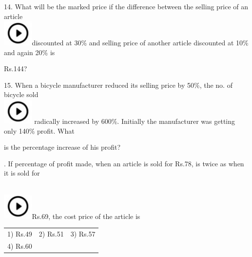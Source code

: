 \documentclass{article} %
\begin{document}
\noindent 

14. What will be  the  marked  price if the  difference between the  selling price  of an article  
\noindent \\ \includegraphics*[width=0.60in, height=0.52in]{images/image1}discounted at 30\% and selling price of another article discounted at 10\% and again 20\% is

\noindent Rs.144?

\noindent 

\noindent 

15. When  a  bicycle  manufacturer  reduced  its  selling  price  by  50\%,  the  no.  of  bicycle  sold  
\noindent \\ \includegraphics*[width=0.60in, height=0.52in]{images/image1} radically increased by 600\%. Initially the manufacturer was getting only 140\% profit. What

\noindent is the percentage increase of his profit?

\noindent 

\noindent 

. If percentage of profit made, when an article is sold for Rs.78, is twice as when it is sold for

\noindent  
\noindent \\ \includegraphics*[width=0.60in, height=0.52in]{images/image1}Rs.69, the cost price of the article is

\noindent 
\begin{tabular}{p{1.7in} p{1.6in} p{1.6in}} \\ 
	1) Rs.49                   &  2) Rs.51                         &  3) Rs.57                         \\
4) Rs.60 \\
\end{tabular}

\noindent 

\noindent 

\noindent 
\end{document}
